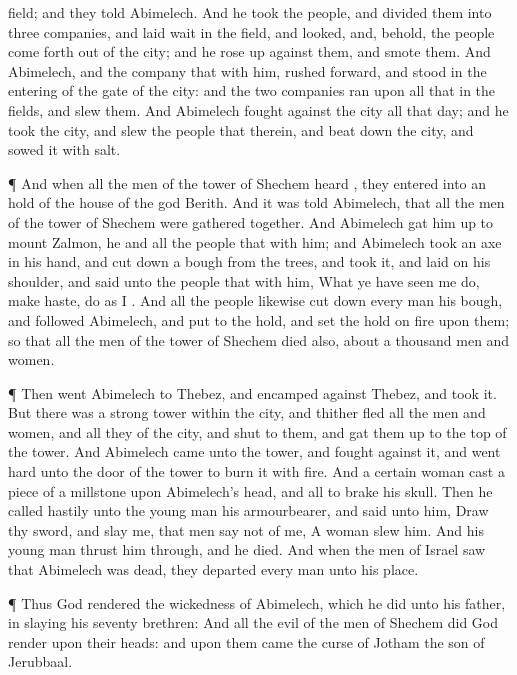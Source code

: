 {field; and they
told
Abimelech.
And he
took the
people, and
divided them into
three
companies, and laid
wait in the
field, and
looked, and, behold, the
people
{} come
forth out of the
city; and he rose
up against them, and
smote them.
And
Abimelech, and the
company that
{} with him, rushed
forward, and
stood in the
entering of the
gate of the
city: and the
two
{}
companies ran
upon all
{} that
{} in the
fields, and
slew them.
And
Abimelech
fought against the
city all that
day; and he
took the
city, and
slew the
people that
{} therein, and beat
down the
city, and
sowed it with
salt.
\par }{\PP {}¶ And when all the
men of the
tower of
Shechem
heard
{}, they
entered into an
hold of the
house of the
god
Berith.
And it was
told
Abimelech, that all the
men of the
tower of
Shechem were gathered
together.
And
Abimelech gat him
up to
mount
Zalmon, he and all the
people that
{} with him; and
Abimelech
took an
axe in his
hand, and cut
down a
bough from the
trees, and
took it, and
laid
{} on his
shoulder, and
said unto the
people that
{} with him, What ye have
seen me
do, make
haste,
{}
do as
I
{}.
And all the
people likewise cut
down every
man his
bough, and
followed
Abimelech, and
put
{} to the
hold, and
set the
hold on
fire upon them; so that all the
men of the
tower of
Shechem
died also, about a
thousand
men and
women.
\par }{\PP {}¶ Then
went
Abimelech to
Thebez, and
encamped against
Thebez, and
took it.
But there was a
strong
tower
within the
city, and thither
fled all the
men and
women, and all
they of the
city, and
shut
{} to them, and gat them
up to the
top of the
tower.
And
Abimelech
came unto the
tower, and
fought against it, and went
hard unto the
door of the
tower to
burn it with
fire.
And a
certain
woman
cast a
piece of a
millstone upon
Abimelech’s
head, and all to
brake his
skull.
Then he
called
hastily unto the young
man his
armourbearer, and
said unto him,
Draw thy
sword, and
slay me, that men
say not of me, A
woman
slew him. And his young
man thrust him
through, and he
died.
And when the
men of
Israel
saw that
Abimelech was
dead, they
departed every
man unto his
place.
\par }{\PP {}¶ Thus
God
rendered the
wickedness of
Abimelech, which he
did unto his
father, in
slaying his
seventy
brethren:
And all the
evil of the
men of
Shechem did
God
render upon their
heads: and upon them
came the
curse of
Jotham the
son of
Jerubbaal.

}
